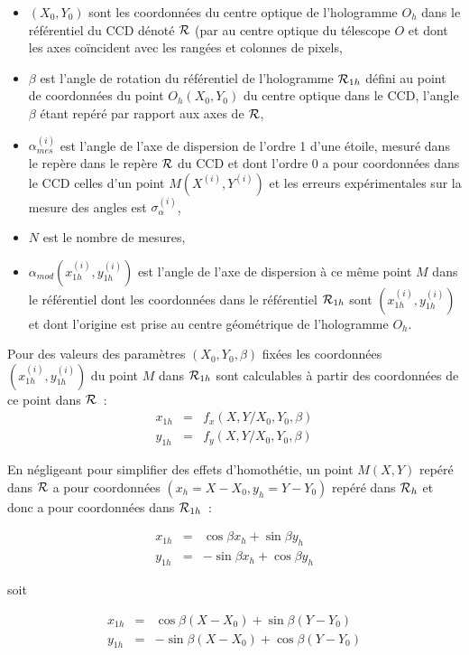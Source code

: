 \documentclass[12pt,twoside]{article}
\begin{document}
\begin{itemize}
\item $(X_0,Y_0)$ sont les coordonnées du centre optique de l'hologramme $O_h$ dans le référentiel du CCD  dénoté ${\cal R }$ (par au centre optique du télescope $O$ et dont les axes coïncident avec les rangées et colonnes de pixels,
\item $\beta$ est l'angle de rotation du référentiel de l'hologramme ${\cal R}_{1h}$ défini au  point de coordonnées du point $O_h(X_0,Y_0)$  du centre optique dans le CCD, l'angle $\beta$ étant repéré par rapport aux axes de ${\cal R }$,
\item  $\alpha_{mes}^{(i)}$ est l'angle de l'axe de dispersion de l'ordre 1 d'une étoile,  mesuré dans le repère dans le repère ${\cal R }$ du CCD  et dont l'ordre 0 a pour coordonnées dans le CCD celles d'un point $M (X^{(i)},Y^{(i)})$ et les erreurs expérimentales sur la mesure des angles est $\sigma_{\alpha}^{(i)}$,
\item $N$ est le nombre de mesures, 
\item $ \alpha_{mod}( x^{(i)}_{1h},y^{(i)}_{1h})$ est l'angle de l'axe de dispersion à ce même point $M$ dans le référentiel dont les coordonnées dans le référentiel ${\cal R}_{1h}$   sont  $( x^{(i)}_{1h},y^{(i)}_{1h})$ et dont l'origine est prise au centre géométrique de l'hologramme $O_h$.

\end{itemize}

Pour des valeurs des paramètres $(X_0,Y_0,\beta)$ fixées les coordonnées $(x^{(i)}_{1h},y^{(i)}_{1h})$ du point $M$ dans ${\cal R}_{1h}$ sont calculables à partir des
coordonnées de ce point dans  ${\cal R}$~:
\begin{eqnarray}
x_{1h} & = & f_x(X,Y/X_0,Y_0, \beta) \\
y_{1h} & = & f_y(X,Y/X_0,Y_0, \beta) 
\end{eqnarray}

En négligeant pour simplifier des effets d'homothétie,
un point $M(X,Y)$ repéré dans  ${\cal R }$ a pour coordonnées $(x_h=X-X_0,y_h=Y-Y_0)$ repéré dans  ${\cal R }_{h}$ et donc a pour coordonnées dans  ${\cal R }_{1h}$~:

\begin{eqnarray}
x_{1h} & = & \cos \beta x_h + \sin \beta y_h \\
y_{1h} & = & -\sin \beta x_h + \cos \beta y_h 
\end{eqnarray} 

soit

\begin{eqnarray}
x_{1h} & = & \cos \beta (X-X_0) + \sin \beta (Y-Y_0) \\
y_{1h} & = & -\sin \beta (X-X_0) + \cos \beta (Y-Y_0)
\end{eqnarray} 
\end{document}
